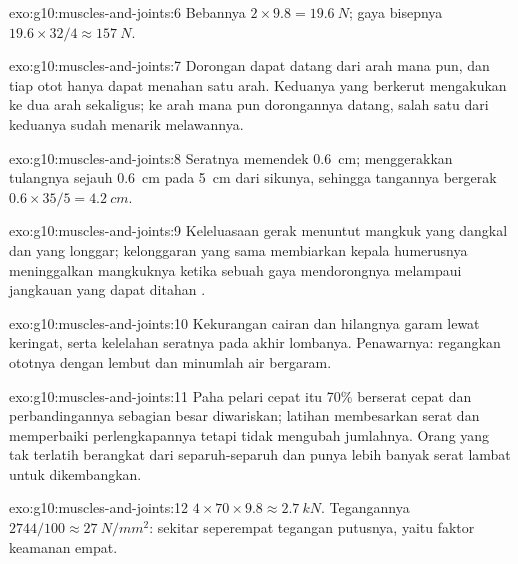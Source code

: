 \begin{solution}{exo:g10:muscles-and-joints:6}
Bebannya $2 \times 9.8 = \qty{19.6}{N}$; gaya bisepnya $19.6 \times 32/4
\approx \qty{157}{N}$.
\end{solution}

\begin{solution}{exo:g10:muscles-and-joints:7}
Dorongan dapat datang dari arah mana pun, dan tiap otot hanya dapat
menahan satu arah. Keduanya yang berkerut mengakukan  ke dua
arah sekaligus; ke arah mana pun dorongannya datang, salah satu dari
keduanya sudah menarik melawannya.
\end{solution}

\begin{solution}{exo:g10:muscles-and-joints:8}
Seratnya memendek \qty{0.6}{cm};  menggerakkan tulangnya
sejauh \qty{0.6}{cm} pada \qty{5}{cm} dari sikunya, sehingga tangannya
bergerak $0.6 \times 35/5 = \qty{4.2}{cm}$.
\end{solution}

\begin{solution}{exo:g10:muscles-and-joints:9}
Keleluasaan gerak menuntut mangkuk yang dangkal dan  yang
longgar; kelonggaran yang sama membiarkan kepala humerusnya
meninggalkan mangkuknya ketika sebuah gaya mendorongnya melampaui
jangkauan yang dapat ditahan .
\end{solution}

\begin{solution}{exo:g10:muscles-and-joints:10}
Kekurangan cairan dan hilangnya garam lewat keringat, serta kelelahan
seratnya pada akhir lombanya. Penawarnya: regangkan ototnya dengan
lembut dan minumlah air bergaram.
\end{solution}

\begin{solution}{exo:g10:muscles-and-joints:11}
Paha pelari cepat itu 70\% berserat cepat dan perbandingannya sebagian
besar diwariskan; latihan membesarkan serat dan memperbaiki
perlengkapannya tetapi tidak mengubah jumlahnya. Orang yang tak
terlatih berangkat dari separuh-separuh dan punya lebih banyak serat
lambat untuk dikembangkan.
\end{solution}

\begin{solution}{exo:g10:muscles-and-joints:12}
$4 \times 70 \times 9.8 \approx \qty{2.7}{kN}$. Tegangannya $2744/100
\approx \qty{27}{N/mm^2}$: sekitar seperempat tegangan putusnya, yaitu
faktor keamanan empat.
\end{solution}

